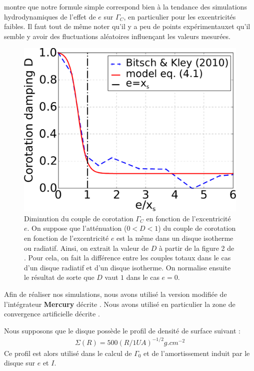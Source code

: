  montre que notre formule simple  correspond bien à la tendance des simulations hydrodynamiques de l'effet de $e$ sur $\Gamma_C$, en particulier pour les excentricités faibles. Il faut tout de même noter qu'il y a peu de points \og expérimentaux\fg et qu'il semble y avoir des fluctuations aléatoires influençant les valeurs mesurées.

\begin{figure}[htbp]
\centering
\includegraphics[width=0.49\linewidth]{figure/shifted/corotation_damping_profile.pdf}
\caption[Amortissement du couple de corotation en fonction de l'excentricité de la planète.]{Diminution du couple de corotation
$\Gamma_C$ en fonction de l'excentricité $e$. On suppose que l'atténuation ($0<D<1$) du couple de corotation en fonction de
l'excentricité $e$ est la même dans un disque isotherme ou radiatif. Ainsi, on extrait la valeur de $D$ à partir de la figure 2 de
\cite{bitsch2010orbital}. Pour cela, on fait la différence entre les couples totaux dans le cas d'un disque radiatif et d'un disque isotherme. On normalise ensuite le résultat de sorte que $D$ vaut $1$ dans le cas $e=0$.}\label{fig:shifted_CZ_D_profile}
\end{figure}

\bigskip

Afin de réaliser nos simulations, nous avons utilisé la version modifiée de l'intégrateur \textbf{Mercury}\citep{chambers1999hybrid} décrite . Nous avons utilisé en particulier la zone de convergence artificielle décrite . 

Nous supposons que le disque possède le profil de densité de surface suivant :
\begin{align}
\Sigma(R) = 500 \left(R/1\unit{UA}\right)^{-1/2} \unit{g.cm^{-2}}
\end{align}
Ce profil est alors utilisé dans le calcul de $\Gamma_0$ et de l'amortissement induit par le disque sur $e$ et $I$.

